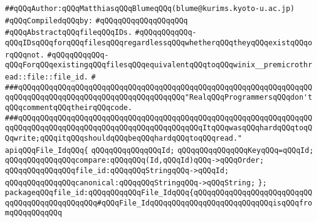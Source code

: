 \label{src/app/makelib/paths/fileid.pkg}
\verb|##qQQqAuthor:qQQqMatthiasqQQqBlumeqQQq(blume@kurims.kyoto-u.ac.jp)|\newline
\newline
\verb|#qQQqCompiledqQQqby:|\newline
\verb|#qQQqqQQqqQQqqQQqqQQq|\newline
\newline
\verb|#qQQqAbstractqQQqfileqQQqIDs.|\newline
\verb|#qQQqqQQqqQQq-qQQqIDsqQQqforqQQqfilesqQQqregardlessqQQqwhetherqQQqtheyqQQqexistqQQqorqQQqnot.|\newline
\verb|#qQQqqQQqqQQq-qQQqForqQQqexistingqQQqfilesqQQqequivalentqQQqtoqQQqwinix__premicrothread::file::file_id.|\newline
\verb|#|\newline
\newline
\newline
\verb|###qQQqqQQqqQQqqQQqqQQqqQQqqQQqqQQqqQQqqQQqqQQqqQQqqQQqqQQqqQQqqQQqqQQqqQQqqQQqqQQqqQQqqQQqqQQqqQQqqQQqqQQqqQQq"RealqQQqProgrammersqQQqdon'tqQQqcommentqQQqtheirqQQqcode.|\newline
\verb|###qQQqqQQqqQQqqQQqqQQqqQQqqQQqqQQqqQQqqQQqqQQqqQQqqQQqqQQqqQQqqQQqqQQqqQQqqQQqqQQqqQQqqQQqqQQqqQQqqQQqqQQqqQQqqQQqItqQQqwasqQQqhardqQQqtoqQQqwrite;qQQqitqQQqshouldqQQqbeqQQqhardqQQqtoqQQqread."|\newline
\newline
\newline
\newline
\verb|apiqQQqFile_IdqQQq{|\newline
\newline
\verb|qQQqqQQqqQQqqQQqId;|\newline
\verb|qQQqqQQqqQQqqQQqKeyqQQq=qQQqId;|\newline
\newline
\verb|qQQqqQQqqQQqqQQqcompare:qQQqqQQq(Id,qQQqId)qQQq->qQQqOrder;|\newline
\newline
\verb|qQQqqQQqqQQqqQQqfile_id:qQQqqQQqStringqQQq->qQQqId;|\newline
\newline
\verb|qQQqqQQqqQQqqQQqcanonical:qQQqqQQqStringqQQq->qQQqString;|\newline
\verb|};|\newline
\newline
\verb|packageqQQqfile_id:qQQqqQQqqQQqFile_IdqQQq{qQQqqQQqqQQqqQQqqQQqqQQqqQQqqQQqqQQqqQQqqQQqqQQq#qQQqFile_IdqQQqqQQqqQQqqQQqqQQqqQQqqQQqisqQQqfromqQQqqQQqqQQq|\newline
